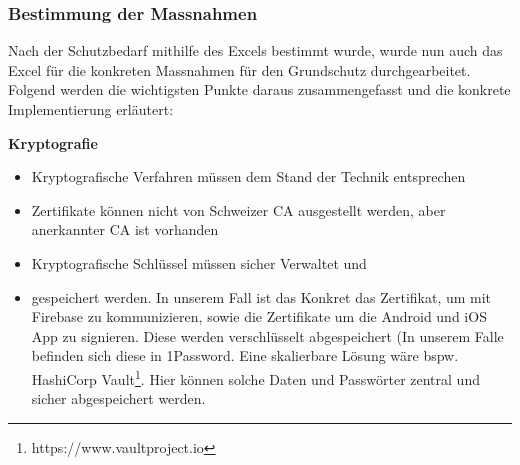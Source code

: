 \subsubsection{Bestimmung der Massnahmen}
Nach der Schutzbedarf mithilfe des Excels bestimmt wurde, wurde nun auch das Excel für die konkreten Massnahmen für den Grundschutz durchgearbeitet. Folgend werden die wichtigsten Punkte daraus zusammengefasst und die konkrete Implementierung erläutert:

\textbf{Kryptografie}
\begin{itemize}
    \item Kryptografische Verfahren müssen dem Stand der Technik entsprechen
    \item Zertifikate können nicht von Schweizer CA ausgestellt werden, aber anerkannter CA ist vorhanden
	\item Kryptografische Schlüssel müssen sicher Verwaltet und
	\item gespeichert werden. In unserem Fall ist das Konkret das Zertifikat, um mit Firebase zu kommunizieren, sowie die Zertifikate um die Android und iOS App zu signieren. Diese werden verschlüsselt abgespeichert (In unserem Falle befinden sich diese in 1Password. Eine skalierbare Lösung wäre bspw. HashiCorp Vault\footnote{https://www.vaultproject.io}. Hier können solche Daten und Passwörter zentral und sicher abgespeichert werden.
\end{itemize}

